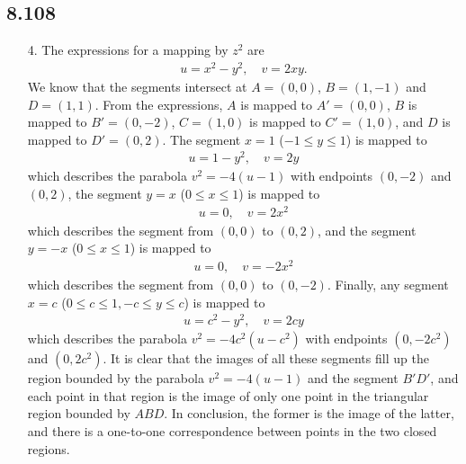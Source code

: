 \documentclass[a4paper,12pt]{article}
\begin{document}
\subsection*{8.108}
\begin{enumerate}
    \item[4.]
        The expressions for a mapping by $z^2$ are
        \begin{align*}
            u = x^2 - y^2, \quad v = 2xy.
        \end{align*}
        We know that the segments intersect at $A = (0, 0)$, $B = (1, -1)$ and $D = (1, 1)$. From the expressions, $A$ is mapped to $A' = (0, 0)$, $B$ is mapped to $B' = (0, -2)$, $C = (1, 0)$ is mapped to $C' = (1, 0)$, and $D$ is mapped to $D' = (0, 2)$. The segment $x = 1$ ($-1 \leq y \leq 1$) is mapped to
        \begin{align*}
            u = 1 - y^2, \quad v = 2y
        \end{align*}
        which describes the parabola $v^2 = -4(u - 1)$ with endpoints $(0, -2)$ and $(0, 2)$, the segment $y = x$ ($0 \leq x \leq 1$) is mapped to
        \begin{align*}
            u = 0, \quad v = 2x^2
        \end{align*}
        which describes the segment from $(0, 0)$ to $(0, 2)$, and the segment $y = -x$ ($0 \leq x \leq 1$) is mapped to
        \begin{align*}
            u = 0, \quad v = -2x^2
        \end{align*}
        which describes the segment from $(0, 0)$ to $(0, -2)$. Finally, any segment $x = c$ ($0 \leq c \leq 1, -c \leq y \leq c$) is mapped to
        \begin{align*}
            u = c^2 - y^2, \quad v = 2cy
        \end{align*}
        which describes the parabola $v^2 = -4c^2(u - c^2)$ with endpoints $(0, -2c^2)$ and $(0, 2c^2)$. It is clear that the images of all these segments fill up the region bounded by the parabola $v^2 = -4(u - 1)$ and the segment $B'D'$, and each point in that region is the image of only one point in the triangular region bounded by $ABD$. In conclusion, the former is the image of the latter, and there is a one-to-one correspondence between points in the two closed regions.
\end{enumerate}
\end{document}
